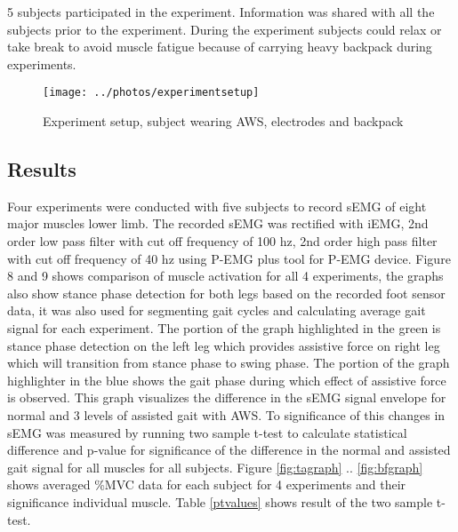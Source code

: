 \documentclass[letterpaper, 10 pt, conference]{ieeeconf}  %
\begin{document}
5 subjects participated in the experiment. Information was shared with all the subjects prior to the experiment. During the experiment subjects could relax or take break to avoid muscle fatigue because of carrying heavy backpack during experiments.

\begin{figure}
	\centering
	\texttt{[image: ../photos/experimentsetup]}
	\caption{Experiment setup, subject wearing AWS, electrodes and backpack }
	\label{fig:experimentsetup}
\end{figure}

\subsection{Results}

Four experiments were conducted with five subjects to record sEMG of eight major muscles lower limb. The recorded sEMG was rectified with iEMG, 2nd order low pass filter with cut off frequency of 100 hz, 2nd order high pass filter with cut off frequency of 40 hz using P-EMG plus tool for P-EMG device. Figure 8 and 9 shows comparison of muscle activation for all 4 experiments, the graphs also show stance phase detection for both legs based on the recorded foot sensor data, it was also used for segmenting gait cycles and calculating average gait signal for each experiment.  The portion of the graph highlighted in the green is stance phase detection on the left leg which provides assistive force on right leg which will transition from stance phase to swing phase. The portion of the graph highlighter in the blue shows the gait phase during which effect of assistive force is observed. This graph visualizes the difference in the sEMG signal envelope for normal and 3 levels of assisted gait with AWS. To significance of this changes in sEMG was measured by running two sample t-test to calculate statistical difference and p-value for significance of the difference in the normal and assisted gait signal for all muscles for all subjects. Figure \ref{fig:tagraph} .. \ref{fig:bfgraph} shows averaged \%MVC data for each subject for 4 experiments and their significance individual muscle. Table \ref{ptvalues} shows result of the two sample t-test.
\end{document}

